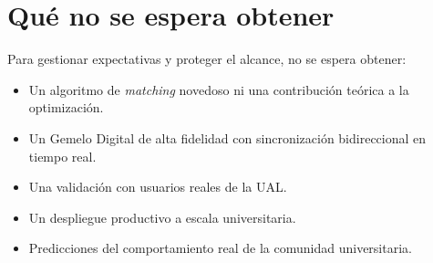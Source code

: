 \section{Qué no se espera obtener}

Para gestionar expectativas y proteger el alcance, no se espera obtener:
\begin{itemize}
    \item Un algoritmo de \textit{matching} novedoso ni una contribución teórica a la optimización.
    \item Un Gemelo Digital de alta fidelidad con sincronización bidireccional en tiempo real.
    \item Una validación con usuarios reales de la UAL.
    \item Un despliegue productivo a escala universitaria.
    \item Predicciones del comportamiento real de la comunidad universitaria.
\end{itemize}
